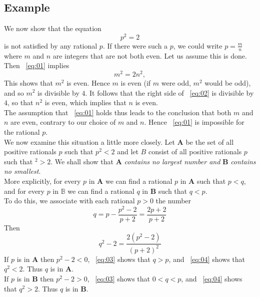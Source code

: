 \subsection*{\textbf{Example}}
\label{subsec:1}
We now show that the equation
\begin{equation}
    \label{eq:01}
    p^2=2
\end{equation}
is not satisfied by any rational $p$. If there were such a $p$, we could write $p=\frac{m}{n}$ where $m$ and $n$ 
are integers that are not both even. Let us assume this is done. Then ~\ref{eq:01} implies
\begin{equation}
    \label{eq:02}
    m^2=2n^2,
\end{equation}
This shows that $m^2$ is even. Hence $m$ is even (if $m$ were odd, $m^2$ would be odd), and so $m^2$ is divisible by $4$.
It follows that the right side of ~\ref{eq:02} is divisible by $4$, so that $n^2$ is even, which implies that $n$ 
is even.\\
\indent The assumption that ~\ref{eq:01} holds thus leads to the conclusion that both $m$ and $n$ are even, contrary 
to our choice of $m$ and $n$. Hence ~\ref{eq:01} is impossible for the rational $p$.\\
\indent We now examine this situation a little more closely. Let $\mathbf{A}$ be the set of all positive rationals $p$ such that $p^2 < 2$ 
and let $B$ consist of all positive rationals $p$ such that $^2 > 2$. We shall show that $\mathbf{A}$ \textit{contains no largest number and}
 $\mathbf{B}$ \textit{contains no smallest}.\\
 \indent More explicitly, for every $p$ in $\mathbf{A}$ we can find a rational $p$ in $\mathbf{A}$ such that 
 $p<q$, and for every $p$ in $\mathbb{B}$ we can find a rational $q$ in $\mathbf{B}$ such that $q<p$.\\
 \indent To do this, we associate with each rational $p>0$ the number
 \begin{equation}
    \label{eq:03}
    q=p-\frac{p^2-2}{p+2}=\frac{2p+2}{p+2}
 \end{equation}
\noindent Then
\begin{equation}
    \label{eq:04}
    q^2-2=\frac{2(p^2-2)}{(p+2)^2}
\end{equation}
\indent If $p$ is in $\mathbf{A}$ then $p^2-2<0$, ~\ref{eq:03} shows that $q>p$, and ~\ref{eq:04} shows that
$q^2<2$. Thus $q$ is in $\mathbf{A}$.\\
\indent If $p$ is in $\mathbf{B}$ then $p^2-2>0$, ~\ref{eq:03} shows that $0<q<p$, and ~\ref{eq:04} shows that
$q^2>2$. Thus $q$ is in $\mathbf{B}$.




